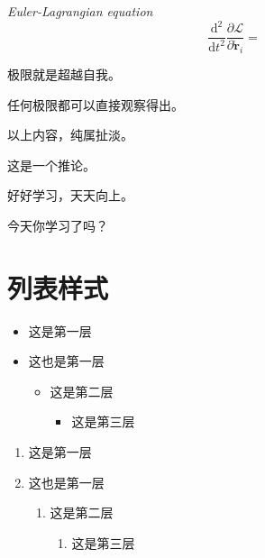 \documentclass[
  10pt,
  twoside,
  openany,
  b5paper, %
  colorscheme = bootstrap-v4, %
]{qyxf-book}
\newcommand{\dd}[2]{\dfrac{\md^2 #1}{\md #2^2}}
\newcommand{\p}[2]{\dfrac{\partial #1}{\partial #2}}
\newcommand{\md}{\mathrm{d}}
\newcommand{\vr}{\boldsymbol{r}}
\newcommand{\dvr}{\dot{\vr}}
\newcommand{\lag}{\mathcal{L}} %
\begin{document}
\begin{pequation}
	\textit{Euler-Lagrangian equation}
	$$
	\dd{}{t}\p{\lag}{\dvr_i}=
	$$
\end{pequation}

\begin{define}
  极限就是超越自我。
\end{define}

\begin{theorem}
  任何极限都可以直接观察得出。
\end{theorem}

\begin{lemma}
  以上内容，纯属扯淡。
\end{lemma}

\begin{corollary}
 这是一个推论。
\end{corollary}

\begin{note}
  好好学习，天天向上。
\end{note}

\begin{alert}
  今天你学习了吗？
\end{alert}

\section{列表样式}
\begin{itemize}
  \item 这是第一层
  \item 这也是第一层
  \begin{itemize}
    \item 这是第二层
    \begin{itemize}
      \item 这是第三层
    \end{itemize}
  \end{itemize}
\end{itemize}

\begin{enumerate}
  \item 这是第一层
  \item 这也是第一层
  \begin{enumerate}
    \item 这是第二层
    \begin{enumerate}
      \item 这是第三层
    \end{enumerate}
  \end{enumerate}
\end{enumerate}
\end{document}
